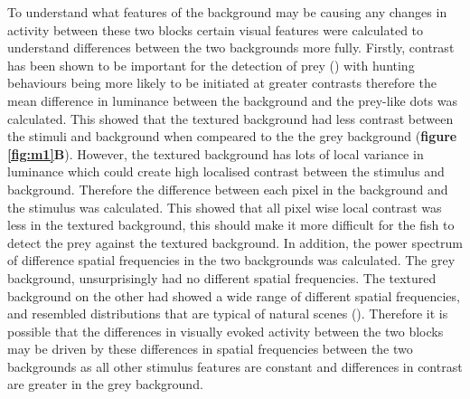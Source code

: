 To understand what features of the background may be causing any changes in activity between these two blocks certain visual features were calculated to understand differences between the two backgrounds more fully. Firstly, contrast has been shown to be important for the detection of prey (\cite{Bianco2011}) with hunting behaviours being more likely to be initiated at greater contrasts therefore the mean difference in luminance between the background and the prey-like dots was calculated. This showed that the textured background had less contrast between the stimuli and background when compeared to the the grey background (\textbf{figure \ref{fig:m1}B}). However, the textured background has lots of local variance in luminance which could create high localised contrast between the stimulus and background. Therefore the difference between each pixel in the background and the stimulus was calculated. This showed that all pixel wise local contrast was less in the textured background, this should make it more difficult for the fish to detect the prey against the textured background. In addition, the power spectrum of difference spatial frequencies in the two backgrounds was calculated. The grey background, unsurprisingly had no different spatial frequencies. The textured background on the other had showed a wide range of different spatial frequencies, and resembled distributions that are typical of natural scenes (\cite{VanderSchaaf1996ModellingInformation}). Therefore it is possible that the differences in visually evoked activity between the two blocks may be driven by these differences in spatial frequencies between the two backgrounds as all other stimulus features are constant and differences in contrast are greater in the grey background.




